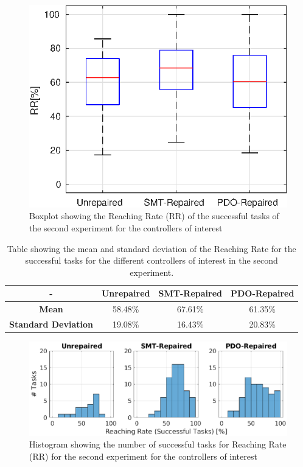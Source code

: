 \begin{figure}[H]
    \centering
    \includegraphics[width=\textwidth]{Images/second-experiment/exp1_RR_succ_box.eps}
    \caption{Boxplot showing the Reaching Rate (RR) of the successful tasks of the second experiment for the controllers of interest}
    \label{fig:box-RR-succ-second}
\end{figure}
\begin{table}[H]
    \centering
    \begin{tabular}{|c|c|c|c|}
        \hline
        - & \textbf{Unrepaired} & \textbf{SMT-Repaired} & \textbf{PDO-Repaired} \\
        \hline
        \textbf{Mean} & 58.48\% & 67.61\% & 61.35\% \\
        \textbf{Standard Deviation} & 19.08\% & 16.43\% & 20.83\% \\
        \hline
    \end{tabular}
    \caption{Table showing the mean and standard deviation of the Reaching Rate for the successful tasks for the different controllers of interest in the second experiment.}
    \label{tab:RR-succ-second-mean-std}
\end{table}
\begin{figure}[H]
    \centering
    \includegraphics[width=\textwidth]{Images/second-experiment/exp1_RR_succ_hist.eps}
    \caption{Histogram showing the number of successful tasks for Reaching Rate (RR) for the second experiment for the controllers of interest}
    \label{fig:hist-RR-succ-second}
\end{figure}
